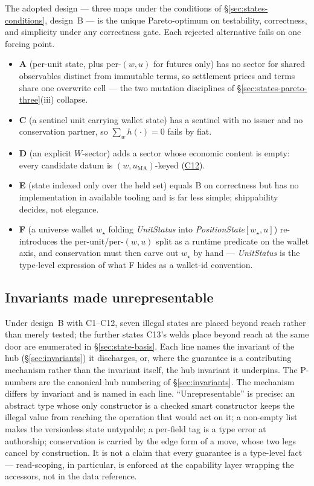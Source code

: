 \documentclass[11pt,a4paper]{article}
\begin{document}
The adopted design --- three maps under the conditions of \S\ref{sec:states-conditions},
design~B --- is the unique Pareto-optimum
on testability, correctness, and simplicity under any correctness gate. Each rejected
alternative fails on one forcing point.

\begin{itemize}[leftmargin=1.4em]
\item \textbf{A} (per-unit state, plus per-$(w,u)$ for futures only) has no sector for
shared observables distinct from immutable terms, so settlement prices and terms share one
overwrite cell --- the two mutation disciplines of \S\ref{sec:states-pareto-three}(iii)
collapse.
\item \textbf{C} (a sentinel unit carrying wallet state) has a sentinel with no issuer and
no conservation partner, so $\sum_{w}h(\cdot)=0$ fails by fiat.
\item \textbf{D} (an explicit $W$-sector) adds a sector whose economic content is empty:
every candidate datum is $(w,u_{\mathrm{MA}})$-keyed (\hyperref[cond:C12]{C12}).
\item \textbf{E} (state indexed only over the held set) equals B on correctness but has no
implementation in available tooling and is far less simple; shippability decides, not
elegance.
\item \textbf{F} (a universe wallet $w_\star$ folding \emph{UnitStatus} into
\emph{PositionState}$[w_\star,u]$) re-introduces the per-unit/per-$(w,u)$ split as a runtime
predicate on the wallet axis, and conservation must then carve out $w_\star$ by hand ---
\emph{UnitStatus} is the type-level expression of what F hides as a wallet-id convention.
\end{itemize}

\subsection{Invariants made unrepresentable}
\label{sec:states-unrep}

Under design~B with C1--C12, seven illegal states are placed beyond reach rather than
merely tested; the further states C13's welds place beyond reach at the same door are
enumerated in \S\ref{sec:state-basis}. Each line names the invariant of the hub (\S\ref{sec:invariants}) it
discharges, or, where the guarantee is a contributing mechanism rather than the invariant
itself, the hub invariant it underpins. The P-numbers are the canonical hub numbering of
\S\ref{sec:invariants}. The mechanism differs by invariant and is named in each line. ``Unrepresentable'' is precise: an abstract
type whose only constructor is a checked smart constructor keeps the illegal value from
reaching the operation that would act on it; a non-empty list makes the versionless state
untypable; a per-field tag is a type error at authorship; conservation is carried by the edge
form of a move, whose two legs cancel by construction. It is not a claim that every guarantee
is a type-level fact --- read-scoping, in particular, is enforced at the capability layer
wrapping the accessors, not in the data reference.
\end{document}
